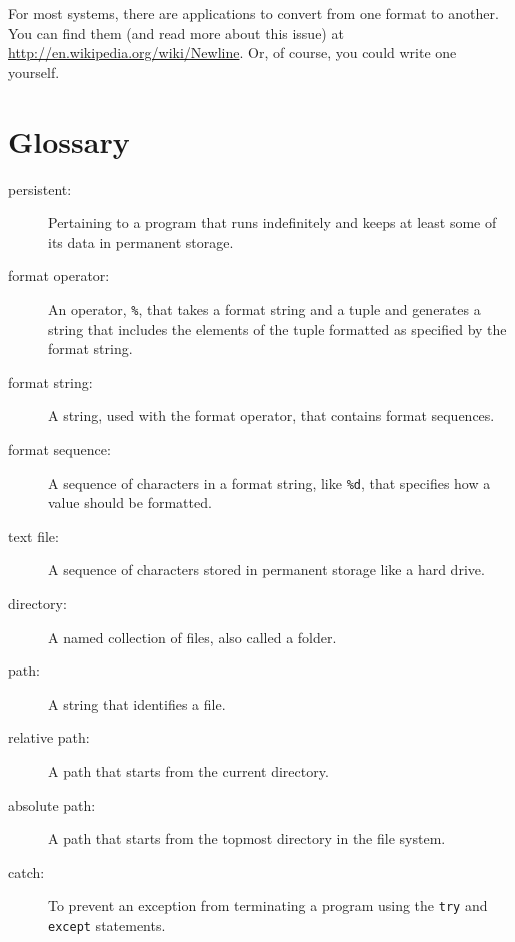 \documentclass[10pt]{book}
\begin{document}
\begin{CJK}{UTF8}{gbsn}
For most systems, there are applications to convert from one
format to another.  You can find them (and read more about this
issue) at \url{http://en.wikipedia.org/wiki/Newline}.  Or, of course, you
could write one yourself.


\section{Glossary}

\begin{description}

\item[persistent:] Pertaining to a program that runs indefinitely
and keeps at least some of its data in permanent storage.

\item[format operator:] An operator, {\tt \%}, that takes a format
string and a tuple and generates a string that includes
the elements of the tuple formatted as specified by the format string.

\item[format string:] A string, used with the format operator, that
contains format sequences.  

\item[format sequence:] A sequence of characters in a format string,
like {\tt \%d}, that specifies how a value should be formatted.

\item[text file:] A sequence of characters stored in permanent
storage like a hard drive.

\item[directory:] A named collection of files, also called a folder.

\item[path:] A string that identifies a file.

\item[relative path:] A path that starts from the current directory.

\item[absolute path:] A path that starts from the topmost directory
in the file system.

\item[catch:] To prevent an exception from terminating
a program using the {\tt try}
and {\tt except} statements.


\end{description}
\end{CJK}
\end{document}

